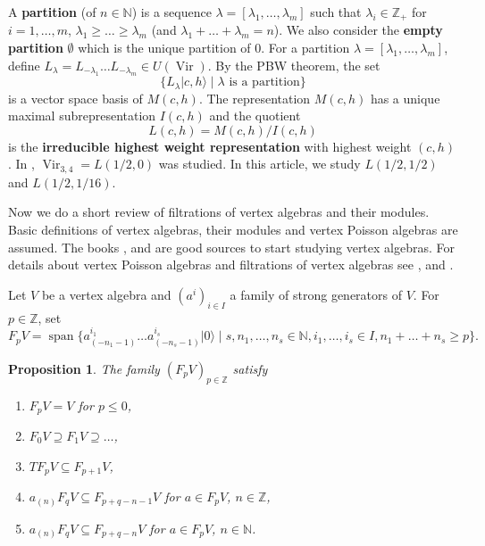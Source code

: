 \documentclass[12pt, a4paper]{article}
\newtheorem{proposition}{Proposition}
\DeclareMathOperator{\Vir}{Vir}
\DeclareMathOperator{\vspan}{span}
\newcommand{\vac}{|0\rangle}
\begin{document}
A \textbf{partition} (of $n \in \mathbb{N}$) is a sequence $\lambda=[\lambda_1, \dots, \lambda_m]$ such that $\lambda_i \in \mathbb{Z}_+$ for $i=1, \dots, m$, $\lambda_1 \ge \dots \ge \lambda_m$ (and $\lambda_1 + \dots + \lambda_m = n$).
We also consider the \textbf{empty partition} $\emptyset$ which is the unique partition of $0$.
For a partition $\lambda = [\lambda_1, \dots, \lambda_m]$, define $L_{\lambda} = L_{-\lambda_1}\dots L_{-\lambda_m} \in U(\Vir)$.
By the PBW theorem, the set
\begin{equation*}
  \{L_\lambda|c,h\rangle \mid \lambda\text{ is a partition}\}
\end{equation*}
is a vector space basis of $M(c, h)$.
The representation $M(c, h)$ has a unique maximal subrepresentation $I(c, h)$ and the quotient
\begin{equation*}
  L(c, h)=M(c, h)/I(c, h)
\end{equation*}
is the \textbf{irreducible highest weight representation} with highest weight $(c, h)$.
In \cite{andrews_singular_2022}, $\Vir_{3, 4}=L(1/2, 0)$ was studied.
In this article, we study $L(1/2, 1/2)$ and $L(1/2, 1/16)$.

Now we do a short review of filtrations of vertex algebras and their modules.
Basic definitions of vertex algebras, their modules and vertex Poisson algebras are assumed.
The books \cite{kac_vertex_1998}, \cite{frenkel_vertex_2001} and \cite{lepowsky_introduction_2004} are good sources to start studying vertex algebras.
For details about vertex Poisson algebras and filtrations of vertex algebras see \cite{li_vertex_2004}, \cite{li_abelianizing_2005} and \cite{arakawa_remark_2012}.

Let $V$ be a vertex algebra and $(a^i)_{i \in I}$ a family of strong generators of $V$.
For $p \in \mathbb{Z}$, set
\begin{equation*}
  F_pV = \vspan\{a^{i_1}_{(-n_1 - 1)}\dots a^{i_s}_{(-n_s - 1)}\vac \mid s, n_1, \dots, n_s \in \mathbb{N}, i_1, \dots, i_s \in I, n_1 + \dots + n_s \ge p\}.
\end{equation*}

\begin{proposition}
  \label{prp:1}
  The family $(F_pV)_{p\in \mathbb{Z}}$ satisfy
  \begin{enumerate}[label={(\alph*)}]
  \item $F_pV = V$ for $p \le 0$,
  \item $F_0V \supseteq F_1V \supseteq \dots$,
  \item $TF_pV \subseteq F_{p+1}V$,
  \item $a_{(n)}F_qV \subseteq F_{p + q - n - 1}V$ for $a \in F_pV$, $n \in \mathbb{Z}$,
  \item $a_{(n)}F_qV \subseteq F_{p + q - n}V$ for $a \in F_pV$, $n \in \mathbb{N}$.
  \end{enumerate}
\end{proposition}
\end{document}
